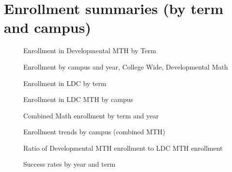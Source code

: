 \chapter{Enrollment summaries (by term and campus)}\label{sec:app:enrollment}

\begin{figure}[!htb]
	\centering
	
	\caption{Enrollment in Developmental MTH by Term}
\end{figure}
\begin{figure}[!htb]
	\centering
	
	\caption{Enrollment by campus and year, College Wide, Developmental Math}
\end{figure}
\begin{figure}[!htb]
	\centering
	
	\caption{Enrollment in LDC by term}
\end{figure}
\begin{figure}[!htb]
	\centering
	
	\caption{Enrollment in LDC MTH by campus}
\end{figure}
\begin{figure}[!htb]
	\centering
	
	\caption{Combined Math enrollment by term and year}
\end{figure}
\begin{figure}[!htb]
	\centering
	
	\caption{Enrollment trends by campus (combined MTH)}
\end{figure}
\begin{figure}[!htb]
	\centering
	
	\caption{Ratio of Developmental MTH enrollment to LDC MTH enrollment}
\end{figure}
\begin{figure}[!htb]
	\centering
	
	\caption{Success rates by year and term}
\end{figure}

